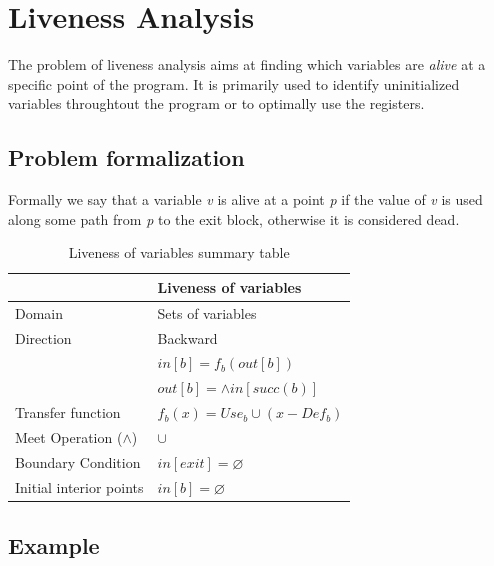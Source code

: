 \documentclass{article}
\begin{document}
\section{Liveness Analysis}

The problem of liveness analysis aims at finding which variables are \textit{alive} at a specific point of the program. It is primarily used to identify uninitialized variables throughtout the program or to optimally use the registers.

\subsection{Problem formalization}

Formally we say that a variable \textit{v} is alive at a point \textit{p} if the value of \textit{v} is used along some path from \textit{p} to the exit block, otherwise it is considered dead.

\begin{table}[H]
\centering
\begin{tabular}{|p{}|p{}|}
\hline
 & \textbf{Liveness of variables} \\
\hline
Domain & Sets of variables \\
\hline
Direction & Backward \\
 & $in[b] = f_b(out[b]) $ \\
 & $out[b] = \wedge in[succ(b)]$ \\
\hline
Transfer function & $f_b(x) = Use_b \cup (x - Def_b)$ \\
\hline
Meet Operation ($\wedge$) & $\cup$ \\
\hline
Boundary Condition & $in[exit] = \varnothing$ \\
\hline
Initial interior points & $in[b] = \varnothing$ \\
\hline
\end{tabular}
\caption{Liveness of variables summary table}
\label{tab:liveness}
\end{table}

\subsection{Example}
\end{document}
